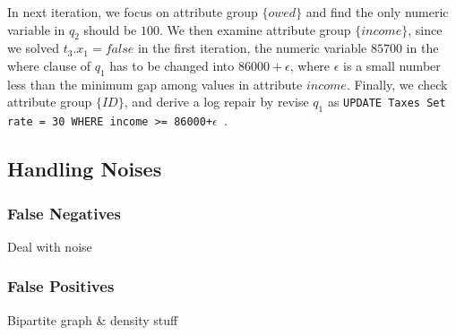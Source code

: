 \begin{example}
\smallskip

In next iteration, we focus on attribute group $\{owed\}$ and find
the only numeric variable in $q_2$ should be $100$.
We then examine attribute group $\{income\}$, since we solved
$t_3.x_1 = false$ in the first iteration, the numeric 
variable $85700$ in the where clause of $q_1$ has to be 
changed into $86000+\epsilon$, where $\epsilon$
is a small number less than the minimum gap among values in
attribute $income$. Finally, we check attribute group
$\{ID\}$, and derive a log repair by revise $q_1$ as
\texttt{UPDATE Taxes Set rate = 30 WHERE income >= 86000+$\epsilon$ }. 
\end{example}

\subsection{Handling Noises}
\label{sec:noise}
\subsubsection{False Negatives}
Deal with noise

\subsubsection{False Positives}
Bipartite graph \& density stuff